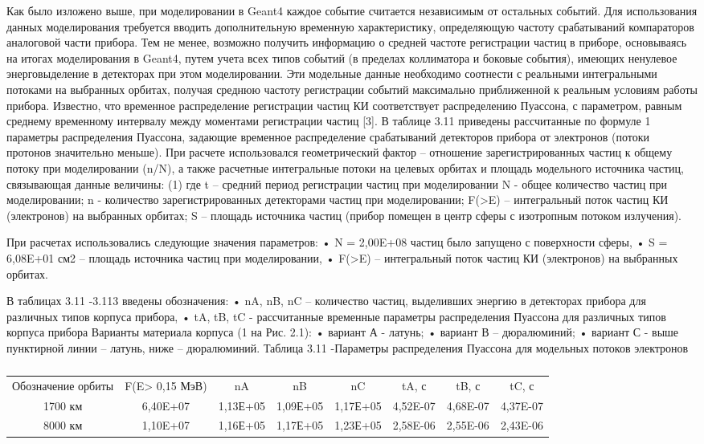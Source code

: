 Как было изложено выше, при моделировании в Geant4 каждое событие считается независимым от остальных событий. Для использования данных моделирования требуется вводить дополнительную временную характеристику, определяющую частоту срабатываний компараторов аналоговой части прибора. Тем не менее, возможно получить информацию о средней частоте регистрации частиц в приборе, основываясь на итогах моделирования в Geant4, путем учета всех типов событий (в пределах коллиматора и боковые события), имеющих ненулевое энерговыделение в детекторах при этом моделировании. Эти модельные данные необходимо соотнести с реальными интегральными потоками на выбранных орбитах, получая среднюю частоту регистрации событий максимально приближенной к реальным условиям работы прибора.
Известно, что временное распределение регистрации частиц КИ соответствует распределению Пуассона, с параметром, равным среднему временному интервалу между моментами регистрации частиц [3].
В таблице 3.11 приведены рассчитанные по формуле 1 параметры распределения Пуассона, задающие временное распределение срабатываний детекторов прибора от электронов (потоки протонов значительно меньше). При расчете использовался геометрический фактор – отношение зарегистрированных частиц к общему потоку при моделировании (n/N), а также расчетные интегральные потоки на целевых орбитах и площадь модельного источника частиц, связывающая данные величины:
(1)
где t – средний период регистрации частиц при моделировании
N - общее количество частиц при моделировании;
n - количество зарегистрированных детекторами частиц при моделировании;
F(>E) – интегральный поток частиц КИ (электронов) на выбранных орбитах;
S – площадь источника частиц (прибор помещен в центр сферы с изотропным потоком излучения). 

При расчетах использовались следующие значения параметров:
•	N = 2,00E+08 частиц было запущено с поверхности сферы,
•	S = 6,08E+01 см2 – площадь источника частиц при моделировании,
•	F(>E) – интегральный поток частиц КИ (электронов) на выбранных орбитах.

В таблицах 3.11 -3.113 введены обозначения:
•	nA, nB, nC – количество частиц, выделивших энергию в детекторах прибора для различных типов корпуса прибора,
•	tA, 	tB, 	tC - рассчитанные временные параметры распределения Пуассона для различных типов корпуса прибора
Варианты материала корпуса (1 на Рис. 2.1):
•	вариант А - латунь;
•	вариант В – дюралюминий;
•	вариант С - выше пунктирной линии – латунь, ниже – дюралюминий.
Таблица 3.11 -Параметры распределения Пуассона для модельных потоков электронов
\begin{table}
	\begin{tabular}{cccccccc}
	Обозначение орбиты & F(E>	0,15 МэВ)	& nA & nB & nC & tA, с & tB, с & tC, с \\ 
	1700 км & 6,40E+07 & 1,13Е+05 & 1,09Е+05 & 1,17Е+05 & 4,52E-07 & 4,68E-07 & 4,37E-07 \\ 
	8000 км &1,10E+07&	1,16Е+05&	1,17Е+05&	1,23Е+05&	2,58E-06&	2,55E-06&	2,43E-06
	\end{tabular} 
	\caption{}
\end{table}



